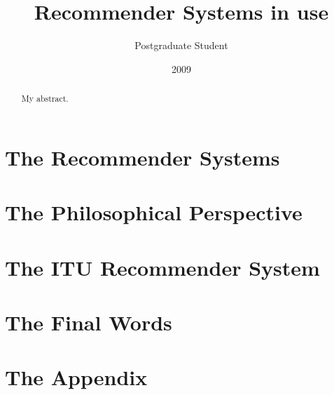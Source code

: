 \documentclass[10pt, oneside]{report}
\title{Recommender Systems in use}
\author{Postgraduate Student}
\date{2009}
\begin{document}
\newcommand\todo[1]{\textcolor{red}{#1}\PackageWarning{TODO:}{#1!}}

\maketitle


\begin{abstract}
My abstract.
\end{abstract}

\tableofcontents

\chapter{The Recommender Systems}
\label{chap:chapter1}





\chapter{The Philosophical Perspective}
\label{chap:chapter2}


\chapter{The ITU Recommender System}
\label{chap:chapter3}






\chapter{The Final Words}
\label{cha:the_final_words}



\chapter{The Appendix}

\end{document}
